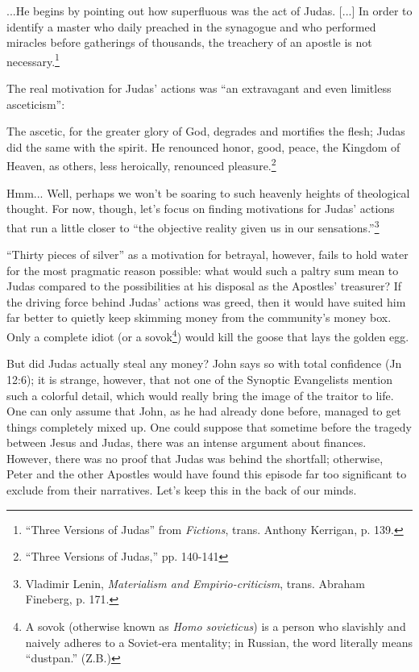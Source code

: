 \begin{smallquote}
    ...He begins by pointing out how superfluous was the act of Judas. [...] In order to identify a master who daily preached in the synagogue and who performed miracles before gatherings of thousands, the treachery of an apostle is not necessary.\footnote{``Three Versions of Judas'' from \emph{Fictions}, trans. Anthony Kerrigan, p. 139.}
\end{smallquote}
The real motivation for Judas' actions was ``an extravagant and even limitless
asceticism'':

\begin{smallquote}
    The ascetic, for the greater glory of God, degrades and mortifies the flesh; Judas did the same with the spirit. He renounced honor, good, peace, the Kingdom of Heaven, as others, less heroically, renounced pleasure.\footnote{``Three Versions of Judas,'' pp. 140-141}
\end{smallquote}
Hmm... Well, perhaps we won't be soaring to such heavenly heights of theological thought. For now, though, let's focus on finding motivations for Judas' actions that run a little closer to ``the objective reality given us in our sensations.''\footnote{Vladimir Lenin, \emph{Materialism and Empirio-criticism}, trans. Abraham Fineberg, p. 171.}

``Thirty pieces of silver'' as a motivation for betrayal, however, fails to hold water for the most pragmatic reason possible: what would such a paltry sum mean to Judas compared to the possibilities at his disposal as the Apostles' treasurer? If the driving force behind Judas' actions was greed, then it would have suited him far better to quietly keep skimming money from the community's money box. Only a complete idiot (or a sovok\footnote{A sovok (otherwise known as \emph{Homo sovieticus}) is a person who slavishly and naively adheres to a Soviet-era mentality; in Russian, the word literally means ``dustpan.'' (Z.B.)}) would kill the goose that lays the golden egg.

But did Judas actually steal any money? John says so with total confidence (Jn 12:6); it is strange, however, that not one of the Synoptic Evangelists mention such a colorful detail, which would really bring the image of the traitor to life. One can only assume that John, as he had already done before, managed to get things completely mixed up. One could suppose that sometime before the tragedy between Jesus and Judas, there was an intense argument about finances. However, there was no proof that Judas was behind the shortfall; otherwise, Peter and the other Apostles would have found this episode far too significant to exclude from their narratives. Let's keep this in the back of our minds.

